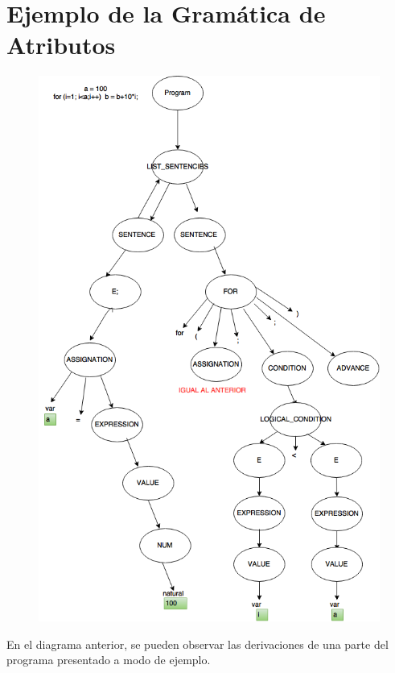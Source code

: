 \documentclass[10pt,a4paper]{article}
\begin{document}
\section{Ejemplo de la Gramática de Atributos}

\begin{figure}[H]
\begin{center}
\includegraphics[scale=0.7]{imgs/ejemploGramatica.png}
\end{center}
\end{figure}

En el diagrama anterior, se pueden observar las derivaciones de una parte del programa presentado a modo de ejemplo.
\end{document}
